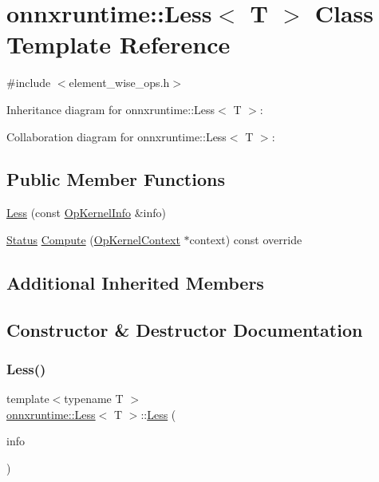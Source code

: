 \hypertarget{classonnxruntime_1_1Less}{}\section{onnxruntime\+:\+:Less$<$ T $>$ Class Template Reference}
\label{classonnxruntime_1_1Less}


{\ttfamily \#include $<$element\+\_\+wise\+\_\+ops.\+h$>$}



Inheritance diagram for onnxruntime\+:\+:Less$<$ T $>$\+:


Collaboration diagram for onnxruntime\+:\+:Less$<$ T $>$\+:
\subsection*{Public Member Functions}
\begin{DoxyCompactItemize}
\item 
\mbox{\hyperlink{classonnxruntime_1_1Less_aa97e82e4b129d0e2ec40530f6e56b040}{Less}} (const \mbox{\hyperlink{classonnxruntime_1_1OpKernelInfo}{Op\+Kernel\+Info}} \&info)
\item 
\mbox{\hyperlink{classonnxruntime_1_1common_1_1Status}{Status}} \mbox{\hyperlink{classonnxruntime_1_1Less_a1ff5214fb355f516196bc5aa84af65ad}{Compute}} (\mbox{\hyperlink{classonnxruntime_1_1OpKernelContext}{Op\+Kernel\+Context}} $\ast$context) const override
\end{DoxyCompactItemize}
\subsection*{Additional Inherited Members}


\subsection{Constructor \& Destructor Documentation}
\mbox{\label{classonnxruntime_1_1Less_aa97e82e4b129d0e2ec40530f6e56b040}} 
\subsubsection{\texorpdfstring{Less()}{Less()}}
{\footnotesize\ttfamily template$<$typename T $>$ \\
\mbox{\hyperlink{classonnxruntime_1_1Less}{onnxruntime\+::\+Less}}$<$ T $>$\+::\mbox{\hyperlink{classonnxruntime_1_1Less}{Less}} (\begin{DoxyParamCaption}\item[{const \mbox{\hyperlink{classonnxruntime_1_1OpKernelInfo}{Op\+Kernel\+Info}} \&}]{info }\end{DoxyParamCaption})\hspace{0.3cm}{\ttfamily [inline]}}



